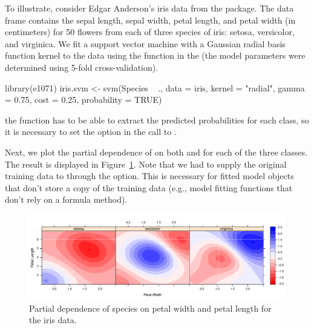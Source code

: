 To illustrate, consider Edgar Anderson's iris data from the  package. The  data frame contains the sepal length, sepal width, petal length, and petal width (in centimeters) for 50 flowers from each of three species of iris:  setosa, versicolor, and virginica. We fit a support vector machine with a Gaussian radial basis function kernel to the data using the  function in the  (the model parameters were determined using 5-fold cross-validation).
\begin{example}
library(e1071)
iris.svm <- svm(Species ~ ., data = iris, kernel = "radial", gamma = 0.75,
                cost = 0.25, probability = TRUE)
\end{example}
 the  function has to be able to extract the predicted probabilities for each class, so it is necessary to set the  option in the call to .

Next, we plot the partial dependence of  on both  and  for each of the three classes. The result is displayed in Figure~\ref{fig:partial_iris}. Note that we had to supply the original training data to  through the  option. This is necessary for fitted model objects that don't store a copy of the training data (e.g., model fitting functions that don't rely on a formula method).

\begin{figure}[htbp]
  \centering
  \includegraphics[width=1.0\linewidth]{partial_iris_svm}
  \caption{Partial dependence of species on petal width and petal length for the iris data.}
  \label{fig:partial_iris}
\end{figure}


